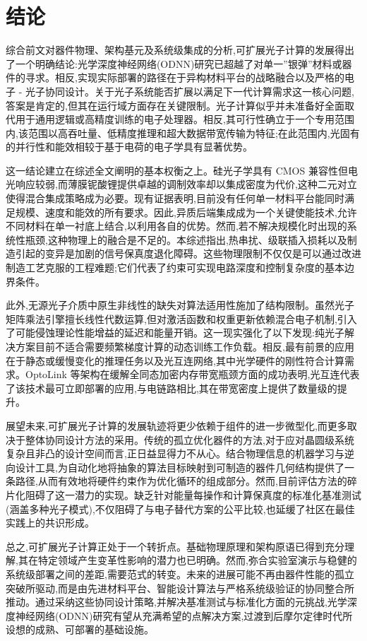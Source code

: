 \documentclass[11pt]{article}
\begin{document}
\section{结论}\label{ux7ed3ux8bba}

综合前文对器件物理、架构基元及系统级集成的分析,可扩展光子计算的发展得出了一个明确结论:光学深度神经网络(ODNN)研究已超越了对单一''银弹''材料或器件的寻求。相反,实现实际部署的路径在于异构材料平台的战略融合以及严格的电子 - 光子协同设计。关于光子系统能否扩展以满足下一代计算需求这一核心问题,答案是肯定的,但其在运行域方面存在关键限制。光子计算似乎并未准备好全面取代用于通用逻辑或高精度训练的电子处理器。相反,其可行性确立于一个专用范围内,该范围以高吞吐量、低精度推理和超大数据带宽传输为特征;在此范围内,光固有的并行性和能效相较于基于电荷的电子学具有显著优势。

这一结论建立在综述全文阐明的基本权衡之上。硅光子学具有 CMOS 兼容性但电光响应较弱,而薄膜铌酸锂提供卓越的调制效率却以集成密度为代价,这种二元对立使得混合集成策略成为必要。现有证据表明,目前没有任何单一材料平台能同时满足规模、速度和能效的所有要求。因此,异质后端集成成为一个关键使能技术,允许不同材料在单一衬底上结合,以利用各自的优势。然而,若不解决规模化时出现的系统性瓶颈,这种物理上的融合是不足的。本综述指出,热串扰、级联插入损耗以及制造引起的变异是加剧的信号保真度退化障碍。这些物理限制不仅仅是可以通过改进制造工艺克服的工程难题;它们代表了约束可实现电路深度和控制复杂度的基本边界条件。

此外,无源光子介质中原生非线性的缺失对算法适用性施加了结构限制。虽然光子矩阵乘法引擎擅长线性代数运算,但对激活函数和权重更新依赖混合电子机制,引入了可能侵蚀理论性能增益的延迟和能量开销。这一现实强化了以下发现:纯光子解决方案目前不适合需要频繁梯度计算的动态训练工作负载。相反,最有前景的应用在于静态或缓慢变化的推理任务以及光互连网络,其中光学硬件的刚性符合计算需求。OptoLink 等架构在缓解全同态加密内存带宽瓶颈方面的成功表明,光互连代表了该技术最可立即部署的应用,与电链路相比,其在带宽密度上提供了数量级的提升。

展望未来,可扩展光子计算的发展轨迹将更少依赖于组件的进一步微型化,而更多取决于整体协同设计方法的采用。传统的孤立优化器件的方法,对于应对晶圆级系统复杂且非凸的设计空间而言,正日益显得力不从心。结合物理信息的机器学习与逆向设计工具,为自动化地将抽象的算法目标映射到可制造的器件几何结构提供了一条路径,从而有效地将硬件约束作为优化循环的组成部分。然而,目前评估方法的碎片化阻碍了这一潜力的实现。缺乏针对能量每操作和计算保真度的标准化基准测试(涵盖多种光子模式),不仅阻碍了与电子替代方案的公平比较,也延缓了社区在最佳实践上的共识形成。

总之,可扩展光子计算正处于一个转折点。基础物理原理和架构原语已得到充分理解,其在特定领域产生变革性影响的潜力也已明确。然而,弥合实验室演示与稳健的系统级部署之间的差距,需要范式的转变。未来的进展可能不再由器件性能的孤立突破所驱动,而是由先进材料平台、智能设计算法与严格系统级验证的协同整合所推动。通过采纳这些协同设计策略,并解决基准测试与标准化方面的元挑战,光学深度神经网络(ODNN)研究有望从充满希望的点解决方案,过渡到后摩尔定律时代所设想的成熟、可部署的基础设施。



\end{document}
